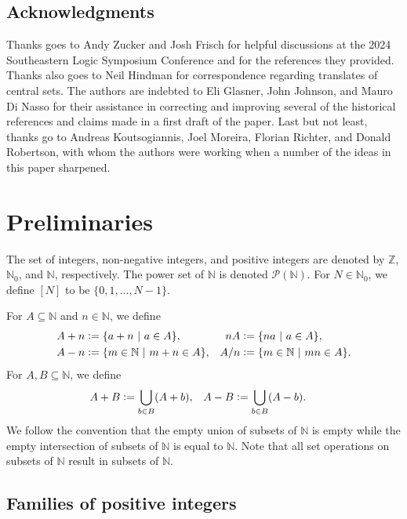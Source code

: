 \documentclass[letter,11pt]{article}
\theoremstyle{plain}
\theoremstyle{definition}
\theoremstyle{plain}
\theoremstyle{plain}
\numberwithin{equation}{section}
\newcommand{\N}{\mathbb{N}}
\newcommand{\Z}{\mathbb{Z}}
\newcommand{\defeq}{\vcentcolon=}
\begin{document}
\subsection{Acknowledgments}

Thanks goes to Andy Zucker and Josh Frisch for helpful discussions at the 2024 Southeastern Logic Symposium Conference and for the references they provided.  Thanks also goes to Neil Hindman for correspondence regarding translates of central sets.  The authors are indebted to Eli Glasner, John Johnson, and Mauro Di Nasso for their assistance in correcting and improving several of the historical references and claims made in a first draft of the paper. Last but not least, thanks go to Andreas Koutsogiannis, Joel Moreira, Florian Richter, and Donald Robertson, with whom the authors were working when a number of the ideas in this paper sharpened. 

\section{Preliminaries}
\label{sec_prelims}


The set of integers, non-negative integers, and positive integers are denoted by $\Z$, $\N_0$, and $\N$, respectively.  The power set of $\N$ is denoted $\mathcal{P}(\N)$.  For $N \in \N_0$, we define $[N]$ to be $\{0, 1, \ldots, N - 1\}$.

For $A \subseteq \N$ and $n \in \N$, we define
\begin{align*}
    A+n &\defeq \{a + n \ | \ a \in A \}, & nA & \defeq \{ na \ | \ a \in A\}, \\
    A-n &\defeq \{m \in \N \ | \ m + n \in A \}, & A/n & \defeq \{ m \in \N \ | \ mn \in A\}.
\end{align*}
For $A, B \subseteq \N$, we define
\begin{align*}
    A+B &\defeq \bigcup_{b \in B} (A + b), & A-B &\defeq \bigcup_{b \in B} (A-b).
\end{align*}
We follow the convention that the empty union of subsets of $\N$ is empty while the empty intersection of subsets of $\N$ is equal to $\N$. Note that all set operations on subsets of $\N$ result in subsets of $\N$.




\subsection{Families of positive integers}
\label{sec_combinatorics}
\end{document}
